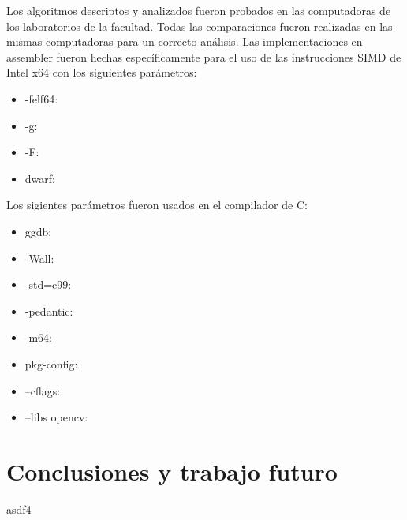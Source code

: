 \documentclass[a4paper]{article}
\begin{document}
Los algoritmos descriptos y analizados fueron probados en las computadoras de los laboratorios de la facultad. Todas las comparaciones fueron realizadas en las mismas computadoras para un correcto an\'alisis.
Las implementaciones en assembler fueron hechas específicamente para el uso de las instrucciones SIMD de Intel x64 con los siguientes par\'ametros:
\begin{itemize}
	\item -felf64:
	\item -g:
	\item -F:
	\item dwarf:
\end{itemize}
Los sigientes par\'ametros fueron usados en el compilador de C:
\begin{itemize}
	\item ggdb:
	\item -Wall:
	\item -std=c99:
	\item -pedantic:
	\item -m64:
	
	\item pkg-config:
	\item --cflags:
	\item --libs opencv:
\end{itemize}


%
\newpage

\newpage

\newpage

\newpage

\newpage
\section{Conclusiones y trabajo futuro}
asdf4
\end{document}
